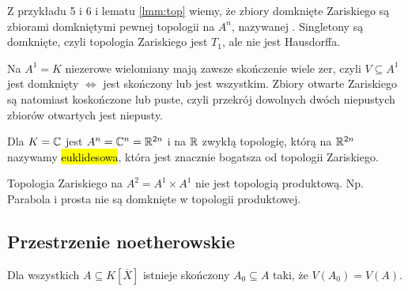 \begin{conclusion}{}{}
  Z przykładu 5 i 6 i lematu \ref{lmm:top} wiemy, że zbiory domknięte Zariskiego są zbiorami domkniętymi pewnej topologii na $A^n$, nazywanej . Singletony są domknięte, czyli topologia Zariskiego jest $T_1$, ale nie jest Hausdorffa.
\end{conclusion}


\begin{example}
  Na $A^1=K$ niezerowe wielomiany mają zawsze skończenie wiele zer, czyli $V\subseteq A^1$ jest domknięty $\iff$ jest skończony lub jest wszystkim. Zbiory otwarte Zariskiego są natomiast koskończone lub puste, czyli przekrój dowolnych dwóch niepustych zbiorów otwartych jest niepusty.
\end{example}

\begin{remark}{}{}
  Dla $K=\mathbb{C}$ jest $A^n=\mathbb{C}^n=\mathbb{R}^{2n}$ i na $\mathbb{R}$ zwykłą topologię, którą na $\mathbb{R}^{2n}$ nazywamy \hl{euklidesowa}, która jest znacznie bogatsza od topologii Zariskiego.

  \begin{center}
  \end{center}
\end{remark}

\begin{remark}{}{}
  Topologia Zariskiego na $A^2=A^1\times A^1$ nie jest topologią produktową. Np. Parabola i prosta nie są domknięte w topologii produktowej.
\end{remark}

\subsection{Przestrzenie noetherowskie}

\begin{proposition}{}{}
  Dla wszystkich $A\subseteq K[\overline{X}]$ istnieje skończony $A_0\subseteq A$ taki, że $V(A_0)=V(A)$.
\end{proposition}

